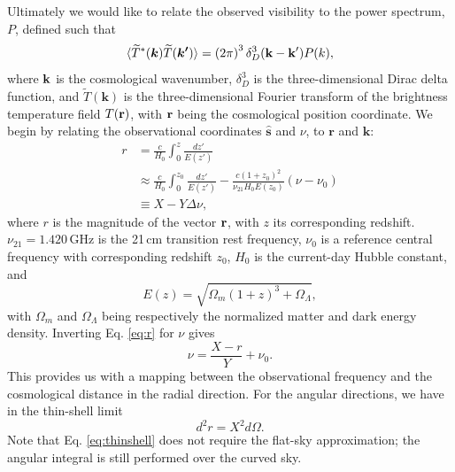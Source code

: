 \documentclass[twocolumn,apj,numberedappendix]{emulateapj}
\renewcommand\[{\begin{equation}}
\renewcommand\]{\end{equation}}
\begin{document}



Ultimately we would like to relate the observed visibility to the power spectrum, $P$, defined such that
\[
\langle \widetilde{T}^{*}(\boldsymbol{k})\widetilde{T}(\boldsymbol{k'})\rangle = \left(2\pi\right)^3\delta_D^3(\bold{k}-\bold{k'})P(k),
\label{eq:Pofk}
\]
where $\bold{k}$ is the cosmological wavenumber, $\delta_D^3$ is the three-dimensional Dirac delta function, and $\widetilde{T}(\boldsymbol{k})$ is the three-dimensional Fourier transform of the brightness temperature field $T(\bold{r})$, with $\bold r$ being the cosmological position coordinate. 
We begin by relating the observational coordinates $\hat{\boldsymbol{s}}$
and $\nu$, to
$\boldsymbol{r}$ and $\boldsymbol{k}$: 
\[
\begin{aligned}r & =\frac{c}{H_{0}}\int_{0}^{z}\frac{dz'}{E(z')}\\
 & \approx\frac{c}{H_{0}}\int_{0}^{z_{0}}\frac{dz'}{E(z')}-\frac{c(1+z_0)^{2}}{\nu_{21}H_{0}E(z_0)}\left(\nu-\nu_{0}\right)\\
 & \equiv X-Y\Delta\nu,
\end{aligned} \label{eq:r}
\]
where $r$ is the magnitude of the vector $\bold{r}$, with $z$ its corresponding redshift. $\nu_{21}=1.420$\,GHz is the 21\,cm transition rest frequency, $\nu_{0}$ is
a reference central frequency with corresponding redshift $z_{0}$, $H_0$ is the current-day Hubble constant,  
and 
\[
E(z)=\sqrt{\Omega_{m}(1+z)^{3}+\Omega_{\Lambda}},
\]
with $\Omega_{m}$ and $\Omega_{\Lambda}$ being respectively the normalized matter and dark energy density. Inverting Eq. \eqref{eq:r} for $\nu$ gives
\begin{equation}
\nu=\frac{X-r}{Y}+\nu_{0}.\label{eq:nur}
\end{equation}
This provides us with a mapping between the observational frequency and the cosmological distance in the radial direction. For the angular directions, we have in the thin-shell limit
\begin{equation}
d^2r=X^2d\Omega. 
\label{eq:thinshell}
\end{equation}
Note that Eq. \eqref{eq:thinshell} does not require the flat-sky approximation; the angular integral is still performed over the curved sky. 
\end{document}
